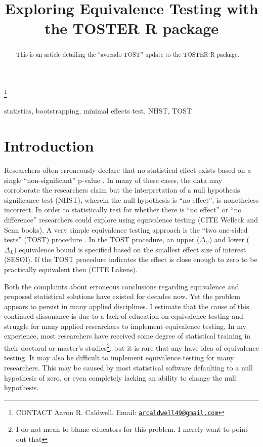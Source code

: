 \documentclass[]{interact}
\theoremstyle{plain}%
\theoremstyle{definition}
\theoremstyle{remark}
\begin{document}

\title{Exploring Equivalence Testing with the TOSTER R package}


\author{
}

\thanks{CONTACT Aaron R.
Caldwell. Email: \href{mailto:arcaldwell49@gmail.com}{\nolinkurl{arcaldwell49@gmail.com}}}

\maketitle

\begin{abstract}
This is an article detailing the ``avocado TOST'' update to the TOSTER R
package.
\end{abstract}

\begin{keywords}
statistics, bootstrapping, minimal effects test, NHST, TOST
\end{keywords}

\hypertarget{introduction}{%
\section{Introduction}\label{introduction}}

Researchers often erroneously declare that no statistical effect exists
based on a single ``non-significant'' p-value \citep{blandaltman95}. In
many of these cases, the data may corroborate the researchers claim but
the interpretation of a null hypothesis significance test (NHST),
wherein the null hypothesis is ``no effect'', is nonetheless incorrect.
In order to statistically test for whether there is ``no effect'' or
``no difference'' researchers could explore using equivalence testing
(CITE Welleck and Senn books). A very simple equivalence testing
approach is the ``two one-sided tests'' (TOST) procedure
\citep{schuirmann1987}. In the TOST procedure, an upper (\(\Delta_U\))
and lower (\(\Delta_L\)) equivalence bound is specified based on the
smallest effect size of interest (SESOI). If the TOST procedure
indicates the effect is close enough to zero to be practically
equivalent then (CITE Lakens).

Both the complaints about erroneous conclusions regarding equivalence
\citep{blandaltman95} and proposed statistical solutions
\citep{schuirmann1987} have existed for decades now. Yet the problem
appears to persist in many applied disciplines. I estimate that the
cause of this continued dissonance is due to a lack of education on
equivalence testing and struggle for many applied researchers to
implement equivalence testing. In my experience, most researchers have
received some degree of statistical training in their doctoral or
master's studies\footnote{I do not mean to blame educators for this
  problem. I merely want to point out that}, but it is rare that any
have idea of equivalence testing. It may also be difficult to implement
equivalence testing for many researchers. This may be caused by most
statistical software defaulting to a null hypothesis of zero, or even
completely lacking an ability to change the null hypothesis.
\end{document}

